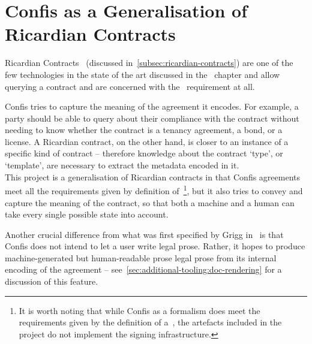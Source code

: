 \section{Confis as a Generalisation of Ricardian Contracts}\label{sec:generalisation-of-ricardian-contracts}

Ricardian Contracts~\cite{grigg2004ricardian} (discussed in~\autoref{subsec:ricardian-contracts}) are one of the few technologies in the state of the art discussed in the~ chapter and allow querying a contract and are concerned with the~ requirement at all.

Confis tries to capture the meaning of the agreement it encodes.
For example, a party should be able to query about their compliance with the contract without needing to know whether the contract is a tenancy agreement, a bond, or a license.
A Ricardian contract, on the other hand, is closer to an instance of a specific kind of contract -- therefore knowledge about the contract `type', or `template', are necessary to extract the metadata encoded in it.\\

This project is a generalisation of Ricardian contracts in that Confis agreements meet all the requirements given by definition of~\footnote{It is worth noting that while Confis as a formalism does meet the requirements given by the definition of a~, the artefacts included in the project do not implement the signing infrastructure.}, but it also tries to convey and capture the meaning of the contract, so that both a machine and a human can take every single possible state into account.

Another crucial difference from what was first specified by Grigg in~\cite{grigg2004ricardian} is that Confis does not intend to let a user write legal prose.
Rather, it hopes to produce machine-generated but human-readable prose legal prose from its internal encoding of the agreement -- see~\autoref{sec:additional-tooling:doc-rendering} for a discussion of this feature.
